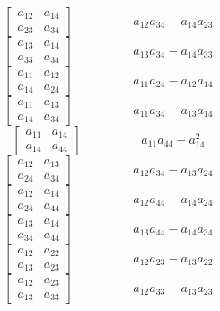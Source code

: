 \documentclass[12pt]{article}
\begin{document}
$$\left[\begin{matrix}a_{12} & a_{14}\\a_{23} & a_{34}\end{matrix}\right]\hspace{2cm} a_{12} a_{34} - a_{14} a_{23}$$   
$$\left[\begin{matrix}a_{13} & a_{14}\\a_{33} & a_{34}\end{matrix}\right]\hspace{2cm} a_{13} a_{34} - a_{14} a_{33}$$   
$$\left[\begin{matrix}a_{11} & a_{12}\\a_{14} & a_{24}\end{matrix}\right]\hspace{2cm} a_{11} a_{24} - a_{12} a_{14}$$   
$$\left[\begin{matrix}a_{11} & a_{13}\\a_{14} & a_{34}\end{matrix}\right]\hspace{2cm} a_{11} a_{34} - a_{13} a_{14}$$   
$$\left[\begin{matrix}a_{11} & a_{14}\\a_{14} & a_{44}\end{matrix}\right]\hspace{2cm} a_{11} a_{44} - a_{14}^{2}$$   
$$\left[\begin{matrix}a_{12} & a_{13}\\a_{24} & a_{34}\end{matrix}\right]\hspace{2cm} a_{12} a_{34} - a_{13} a_{24}$$   
$$\left[\begin{matrix}a_{12} & a_{14}\\a_{24} & a_{44}\end{matrix}\right]\hspace{2cm} a_{12} a_{44} - a_{14} a_{24}$$   
$$\left[\begin{matrix}a_{13} & a_{14}\\a_{34} & a_{44}\end{matrix}\right]\hspace{2cm} a_{13} a_{44} - a_{14} a_{34}$$   
$$\left[\begin{matrix}a_{12} & a_{22}\\a_{13} & a_{23}\end{matrix}\right]\hspace{2cm} a_{12} a_{23} - a_{13} a_{22}$$   
$$\left[\begin{matrix}a_{12} & a_{23}\\a_{13} & a_{33}\end{matrix}\right]\hspace{2cm} a_{12} a_{33} - a_{13} a_{23}$$   
\end{document}

